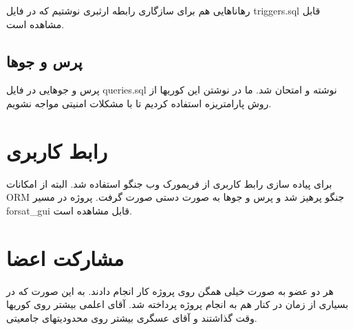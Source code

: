\documentclass{article}
\begin{document}
رهاناهایی هم برای سازگاری رابطه ارثبری نوشتیم که در فایل triggers.sql قابل مشاهده است.

\subsection*{پرس و جوها}
پرس و جوهایی در فایل queries.sql نوشته و امتحان شد. ما در نوشتن این کوریها از روش پارامتریزه استفاده کردیم تا با مشکلات امنیتی مواجه نشویم. 
\section*{رابط کاربری}
برای پیاده سازی رابط کاربری از فریمورک وب جنگو استفاده شد. البته از امکانات ORM جنگو پرهیز شد و پرس و جوها به صورت دستی صورت گرفت. پروژه در مسیر forsat\_gui قابل مشاهده است. 
\section*{مشارکت اعضا}
هر دو عضو به صورت خیلی همگن روی پروژه کار انجام دادند. به این صورت که در بسیاری از زمان در کنار هم به انجام پروژه پرداخته شد. آقای اعلمی بیشتر روی کوریها وقت گذاشتند و آقای عسگری بیشتر روی محدودیتهای جامعیتی.
\end{document}
